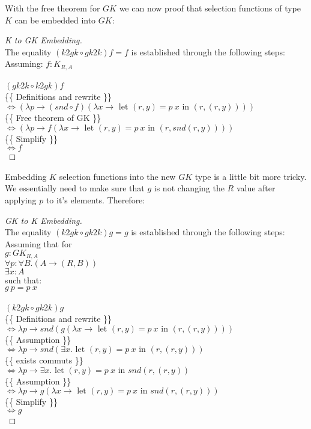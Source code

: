 \documentclass[runningheads]{llncs}
\begin{document}
With the free theorem for \(GK\) we can now proof that selection
functions of type \(K\) can be embedded into \(GK\):

\begin{proof}[K to GK Embedding]\\
The equality $(k2gk \circ gk2k) f = f$ is established through the following steps:\\
Assuming: $f : K_{R,A}$\\
\\
$(gk2k \circ k2gk) f$\\
\{\{ Definitions and rewrite \}\}\\
$\iff (\lambda p \rightarrow (snd \circ f) (\lambda x \rightarrow \text{ let }(r,y) = p\:x\text{ in } (r, (r,y))))$\\
\{\{ Free theorem of GK \}\}\\
$\iff (\lambda p \rightarrow f (\lambda x \rightarrow \text{ let }(r,y) = p\:x \text{ in }(r, snd (r,y))))$\\
\{\{ Simplify \}\}\\
$\iff f$\\
\end{proof}

Embedding \(K\) selection functions into the new \(GK\) type is a little
bit more tricky. We essentially need to make sure that \(g\) is not
changing the \(R\) value after applying \(p\) to it's elements.
Therefore:

\begin{proof}[GK to K Embedding]\\
The equality $(k2gk \circ gk2k) g = g$ is established through the following steps:\\
Assuming that for\\
$g : GK_{R,A} $\\
$\forall p : \forall B . (A \rightarrow (R,B))$\\
$\exists x : A$\\
such that:\\
$g\:p = p\:x$\\
\\
$(k2gk \circ gk2k) g$\\
\{\{ Definitions and rewrite \}\}\\
$\iff \lambda p \rightarrow snd (g(\lambda x \rightarrow \text{ let }(r,y) = p\:x \text{ in }(r, (r,y))))$\\
\{\{ Assumption \}\}\\
$\iff \lambda p \rightarrow snd (\exists x. \text{ let }(r,y) = p\:x\text{ in } (r, (r,y)))$\\
\{\{ exists commuts \}\}\\
$\iff \lambda p \rightarrow \exists x.\text{ let }(r,y) = p\:x\text{ in }snd (r, (r,y))$\\
\{\{ Assumption \}\}\\
$\iff \lambda p \rightarrow g (\lambda x \rightarrow \text{ let }(r,y) = p\:x \text{ in }snd (r, (r,y)))$\\
\{\{ Simplify \}\}\\
$\iff g$\\
\end{proof}
\end{document}
